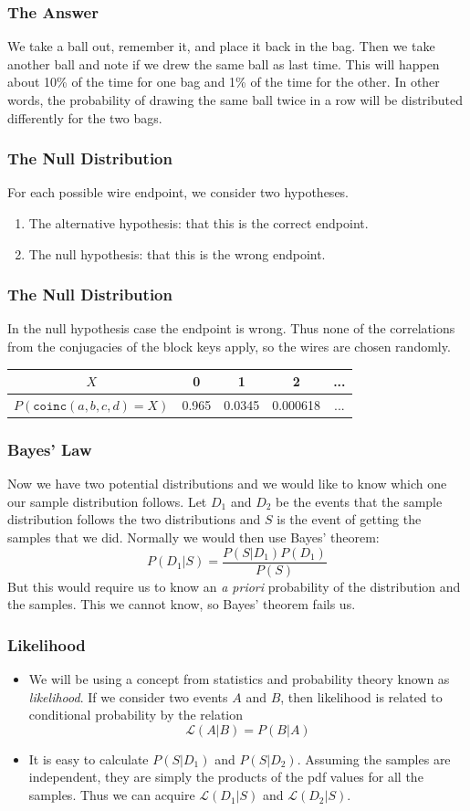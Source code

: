 \documentclass{beamer}
\newcommand{\slide}[2]{
	\begin{frame}
		\frametitle{#1}
		#2
	\end{frame}
}
\begin{document}
\slide{The Answer}{
	We take a ball out, remember it, and place it back in the bag. Then we take another ball and note if we drew the same ball as last time. This will happen about 10\% of the time for one bag and 1\% of the time for the other. In other words, the probability of drawing the same ball twice in a row will be distributed differently for the two bags.
}

\slide{The Null Distribution} {
	For each possible wire endpoint, we consider two hypotheses.
	\begin{enumerate}
		\item The alternative hypothesis: that this is the correct endpoint.
		\item The null hypothesis: that this is the wrong endpoint.
	\end{enumerate}
}

\slide{The Null Distribution}{
	In the null hypothesis case the endpoint is wrong. Thus none of the correlations from the conjugacies of the block keys apply, so the wires are chosen randomly.
	
	\begin{center}
\begin{tabular}{|c|c|c|c|c|}
\hline
$X$ & 0 & 1 & 2 & ... \\
\hline 
$P(\texttt{coinc}(a,b,c,d)=X)$ & 0.965 & 0.0345 & 0.000618 & ... \\

\hline
\end{tabular}
\end{center}
}

\slide{Bayes' Law}{
	 Now we have two potential distributions and we would like to know which one our sample distribution follows. Let $D_1$ and $D_2$ be the events that the sample distribution follows the two distributions and $S$ is the event of getting the samples that we did.  Normally we would then use Bayes' theorem:
\[ P(D_1 | S) = \frac{P(S | D_1) P(D_1)}{P(S)} \]
But this would require us to know an \emph{a priori} probability of the distribution and the samples. This we cannot know, so Bayes' theorem fails us. 
}
\slide{Likelihood} {
	\begin{itemize}	
	\item We will be using a concept from statistics and probability theory known as \emph{likelihood}. If we consider two events $A$ and $B$, then likelihood is related to conditional probability by the relation 
\[ \mathcal{L}(A|B)=P(B|A)\]
\item It is easy to calculate $P(S | D_1 )$ and $P(S | D_2 )$. Assuming the samples are independent, they are simply the products of the pdf values for all the samples. Thus we can acquire $\mathcal{L}(D_1 | S)$ and $\mathcal{L}(D_2 | S)$. 
	\end{itemize}
}
\end{document}
